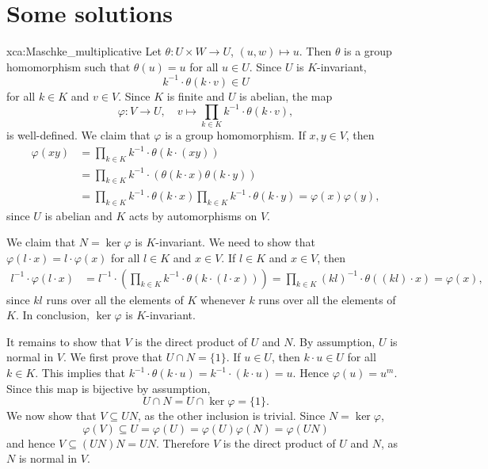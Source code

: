 \section*{Some solutions}

\pagestyle{plain}
\fancyhf{}
\fancyfoot[CE,CO]{\leftmark}
\fancyfoot[LE,RO]{\thepage}


\begin{sol}{xca:Maschke_multiplicative}
Let $\theta\colon U\times W\to U$, $(u,w)\mapsto u$. Then $\theta$ is a group homomorphism such that 
$\theta(u)=u$ for all $u\in U$. Since $U$ is $K$-invariant, 
\[
k^{-1}\cdot \theta(k\cdot v)\in U
\]
for all $k\in K$ and $v\in V$. 
Since $K$ is finite and $U$ is abelian, 
the map 
\[
\varphi\colon V\to U,\quad 
v\mapsto \prod_{k\in K}k^{-1}\cdot \theta(k\cdot v), 
\]
is well-defined. 
We claim that $\varphi$ is a group homomorphism. If $x,y\in V$, then 
\begin{align*}
    \varphi(xy) &= \prod_{k\in K}k^{-1}\cdot \theta(k\cdot (xy))\\
    &= \prod_{k\in K}k^{-1}\cdot (\theta(k\cdot x)\theta(k\cdot y))\\
    &= \prod_{k\in K}k^{-1}\cdot \theta(k\cdot x) \prod_{k\in K}k^{-1}\cdot \theta(k\cdot y)=\varphi(x)\varphi(y),
\end{align*}
since $U$ is abelian and $K$ acts by automorphisms on $V$. 

We claim that $N=\ker\varphi$ is $K$-invariant. 
We need to show that $\varphi(l\cdot x)=l\cdot\varphi(x)$ for all $l\in K$ and $x\in V$. 
If $l\in K$ and $x\in V$, then 
\begin{align*}
l^{-1}\cdot\varphi(l\cdot x)&=l^{-1}\cdot\left(\prod_{k\in K}k^{-1}\cdot \theta(k\cdot (l\cdot x))\right)=\prod_{k\in K}(kl)^{-1}\cdot\theta( (kl)\cdot x)=\varphi(x),
\end{align*}
since $kl$ runs over all the elements of $K$ whenever $k$ runs over all the elements of $K$.
In conclusion, $\ker\varphi$ is $K$-invariant. 

It remains to show that $V$ is the direct product of $U$ and $N$. By assumption, $U$ is normal in $V$. 
We first prove that $U\cap N=\{1\}$. If $u\in U$, then $k\cdot u\in U$ for all $k\in K$. This implies that 
$k^{-1}\cdot\theta(k\cdot u)=k^{-1}\cdot (k\cdot u)=u$. Hence $\varphi(u)=u^m$. Since this map is bijective by assumption,  
\[
U\cap N=U\cap\ker\varphi=\{1\}.
\]
We now show that $V\subseteq UN$, as the other inclusion is trivial. Since $N=\ker\varphi$,  
\[
\varphi(V)\subseteq U=\varphi(U)=\varphi(U)\varphi(N)=\varphi(UN) 
\]
and hence $V\subseteq (UN)N=UN$. 
Therefore $V$ is the direct product of $U$ and $N$, as $N$ is normal in $V$.
\end{sol}

